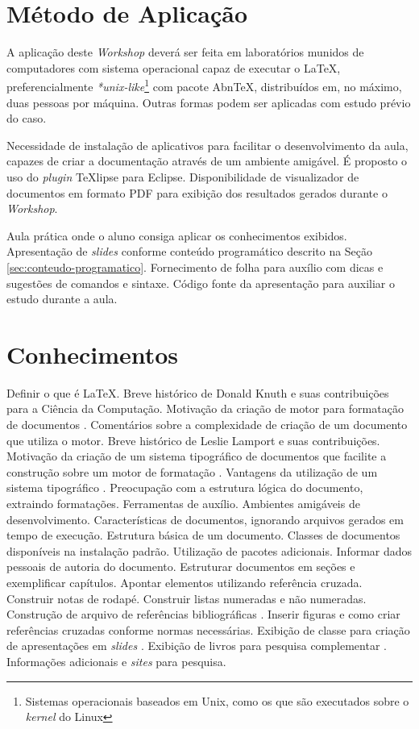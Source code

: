 \documentclass{article}
\begin{document}
\section{Método de Aplicação}
\label{sec:metodo-de-aplicacao}

A aplicação deste \emph{Workshop} deverá ser feita em laboratórios munidos de
computadores com sistema operacional capaz de executar o \LaTeX{},
preferencialmente \emph{*unix-like}\footnote{Sistemas operacionais baseados em
Unix, como os que são executados sobre o \emph{kernel} do Linux} com pacote
Abn\TeX{}, distribuídos em, no máximo, duas pessoas por máquina. Outras formas
podem ser aplicadas com estudo prévio do caso.

Necessidade de instalação de aplicativos para facilitar o desenvolvimento da
aula, capazes de criar a documentação através de um ambiente amigável. É
proposto o uso do \emph{plugin} \TeX{}lipse para Eclipse. Disponibilidade de
visualizador de documentos em formato PDF para exibição dos resultados gerados
durante o \emph{Workshop}.

Aula prática onde o aluno consiga aplicar os conhecimentos exibidos.
Apresentação de \emph{slides} conforme conteúdo programático descrito na Seção
\ref{sec:conteudo-programatico}. Fornecimento de folha para auxílio com dicas e
sugestões de comandos e sintaxe. Código fonte da apresentação para auxiliar o
estudo durante a aula.

\section{Conhecimentos}
\label{sec:conhecimentos}

Definir o que é \LaTeX{}. Breve histórico de Donald Knuth e suas contribuições
para a Ciência da Computação. Motivação da criação de motor para formatação de
documentos \cite{knuth1970}. Comentários sobre a complexidade de criação de um
documento que utiliza o motor. Breve histórico de Leslie Lamport e suas
contribuições. Motivação da criação de um sistema tipográfico de documentos que
facilite a construção sobre um motor de formatação \cite{lamport1985}. Vantagens
da utilização de um sistema tipográfico \cite{oetiker2008}. Preocupação com a
estrutura lógica do documento, extraindo formatações. Ferramentas de auxílio.
Ambientes amigáveis de desenvolvimento. Características de documentos, ignorando
arquivos gerados em tempo de execução. Estrutura básica de um documento. Classes
de documentos disponíveis na instalação padrão. Utilização de pacotes
adicionais. Informar dados pessoais de autoria do documento. Estruturar
documentos em seções e exemplificar capítulos. Apontar elementos utilizando
referência cruzada. Construir notas de rodapé. Construir listas numeradas e não
numeradas. Construção de arquivo de referências bibliográficas
\cite{patashnik1988}. Inserir figuras e como criar referências cruzadas conforme
normas necessárias. Exibição de classe para criação de apresentações em
\emph{slides} \cite{tantau2005}. Exibição de livros para pesquisa complementar
\cite{fiorio2005,moses2007,mittelback2004,downes2002}. Informações adicionais e
\emph{sites} para pesquisa.
\end{document}
